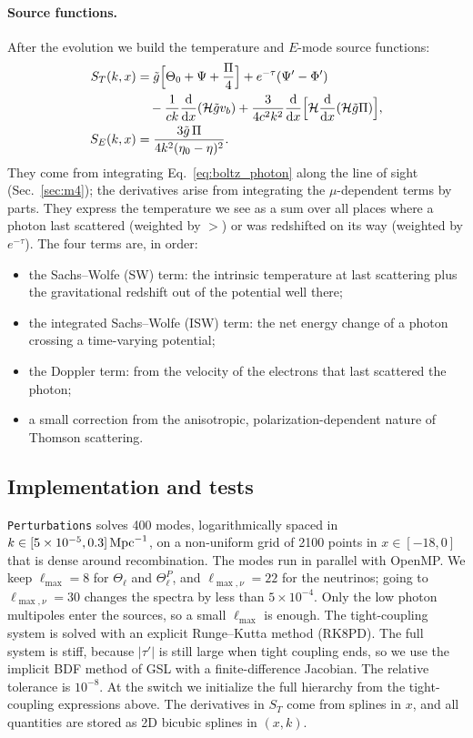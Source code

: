 \paragraph*{Source functions.} After the evolution we build the temperature and $E$-mode source functions:
\begin{align}
S_T(k,x) &= \tilde g\Big[\Theta_0+\Psi+\frac{\Pi}{4}\Big] + e^{-\tau}(\Psi'-\Phi') \nonumber\\
 &\quad - \frac{1}{ck}\frac{\mathrm{d}}{\mathrm{d} x}(\mathcal{H}\tilde g v_b)
  + \frac{3}{4c^2k^2}\frac{\mathrm{d}}{\mathrm{d} x}\Big[\mathcal{H}\frac{\mathrm{d}}{\mathrm{d} x}(\mathcal{H}\tilde g\Pi)\Big], \label{eq:ST}\\
S_E(k,x) &= \frac{3\tilde g\,\Pi}{4k^2(\eta_0-\eta)^2}. \label{eq:SE}
\end{align}
They come from integrating Eq.~\eqref{eq:boltz_photon} along the line of sight (Sec.~\ref{sec:m4}); the derivatives
arise from integrating the $\mu$-dependent terms by parts. They express the temperature we see as a sum over all
places where a photon last scattered (weighted by $\gt$) or was redshifted on its way (weighted by $e^{-\tau}$). The
four terms are, in order:
\begin{itemize}
\item the Sachs--Wolfe (SW) term: the intrinsic temperature at last scattering plus the gravitational redshift out of
      the potential well there;
\item the integrated Sachs--Wolfe (ISW) term: the net energy change of a photon crossing a time-varying potential;
\item the Doppler term: from the velocity of the electrons that last scattered the photon;
\item a small correction from the anisotropic, polarization-dependent nature of Thomson scattering.
\end{itemize}

\subsection{Implementation and tests}

\texttt{Perturbations} solves 400 modes, logarithmically spaced in $k\in[5\times10^{-5},0.3]\,\mathrm{Mpc}^{-1}$, on a
non-uniform grid of 2100 points in $x\in[-18,0]$ that is dense around recombination. The modes run in parallel with
OpenMP. We keep $\ell_{\max}=8$ for $\Theta_\ell$ and $\Theta^P_\ell$, and $\ell_{\max,\nu}=22$ for the neutrinos;
going to $\ell_{\max,\nu}=30$ changes the spectra by less than $5\times10^{-4}$. Only the low photon multipoles enter
the sources, so a small $\ell_{\max}$ is enough. The tight-coupling system is solved with an explicit Runge--Kutta
method (RK8PD). The full system is stiff, because $|\tau'|$ is still large when tight coupling ends, so we use the
implicit BDF method of GSL with a finite-difference Jacobian. The relative tolerance is $10^{-8}$. At the switch we
initialize the full hierarchy from the tight-coupling expressions above. The derivatives in $S_T$ come from splines in
$x$, and all quantities are stored as 2D bicubic splines in $(x,k)$.

